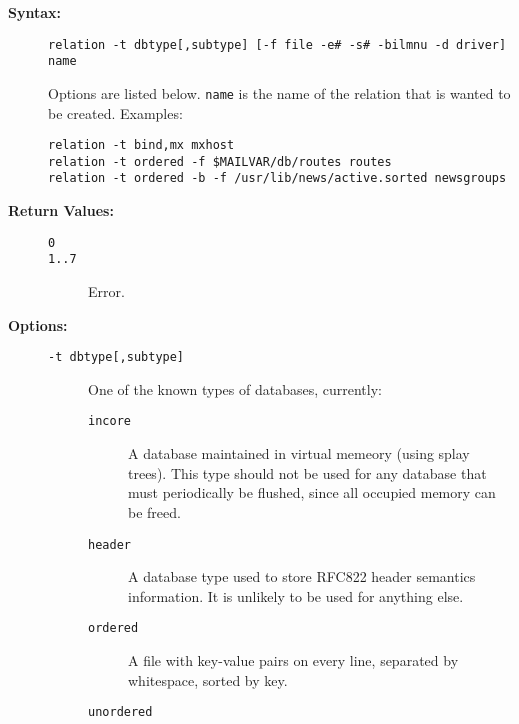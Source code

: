 \begin{description}
\item[{\bf Syntax:}] \mbox{}

{\tt relation -t {dbtype[,subtype] [-f file -e\# -s\# -bilmnu -d driver]} name}

Options are listed below. {\tt name} is the name of the relation
that is wanted to be created. Examples:
\begin{verbatim}
relation -t bind,mx mxhost
relation -t ordered -f $MAILVAR/db/routes routes
relation -t ordered -b -f /usr/lib/news/active.sorted newsgroups
\end{verbatim}




\item[{\bf Return Values:}] \mbox{}

\begin{description}
\item[{\tt 0}] \mbox{}



\item[{\tt 1..7}] \mbox{}

Error.

\end{description}


\item[{\bf Options:}] \mbox{}

\begin{description}
\item[{\tt -t {dbtype[,subtype]}}] \mbox{}

One of the known types 
of databases, currently: 
\begin{description}
\item[{\tt incore}] \mbox{}

A database maintained in virtual memeory (using 
splay trees). This type should not be used for any database that must 
periodically be flushed, since all occupied memory can be freed.

\item[{\tt header}] \mbox{}

A database type used to store RFC822 header 
semantics information. It is unlikely to be used for anything else.

\item[{\tt ordered}] \mbox{}

A file with key-value pairs on every line, 
separated by whitespace, sorted by key. 

\item[{\tt unordered}] \mbox{}


\end{description}
\end{description}
\end{description}
